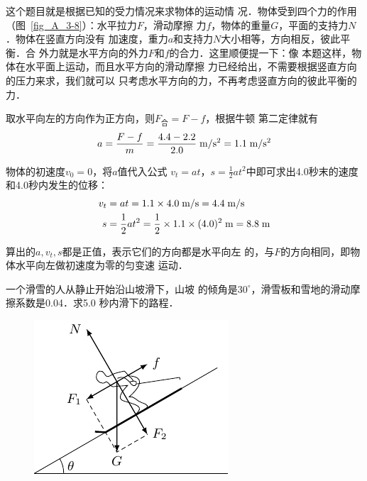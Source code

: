 \begin{solution}
这个题目就是根据已知的受力情况来求物体的运动情
况．物体受到四个力的作用（图~\ref{fig_A_3-8}）：水平拉力$F$，滑动摩擦
力$f$，物体的重量$G$，平面的支持力$N$．物体在竖直方向没有
加速度，重力$a$和支持力$N$大小相等，方向相反，彼此平衡．合
外力就是水平方向的外力$F$和$f$的合力．这里顺便提一下：像
本题这样，物体在水平面上运动，而且水平方向的滑动摩擦
力已经给出，不需要根据竖直方向的压力来求，我们就可以
只考虑水平方向的力，不再考虑竖直方向的彼此平衡的力．



    取水平向左的方向作为正方向，则$F_{\text{合}}=F-f$，根据牛顿
第二定律就有
\[a=\frac{F-f}{m}=\frac{4.4-2.2}{2.0}\;\text{m}/\text{s}^2=1.1\;\text{m}/\text{s}^2 \]
 
 物体的初速度$v_0=0$，将$a$值代入公式
$v_t=at $，$  s=\frac{1}{2}at^2$中即可求出4.0秒末的速度和4.0秒内发生的位移：
\[\begin{split}
v_t&=at=1.1\times 4.0\;\text{m}/\text{s} =4.4\;\text{m}/\text{s}\\
s&=\frac{1}{2}at^2=\frac{1}{2}\times 1.1\times (4.0)^2 \;\text{m}=8.8\;\text{m}
\end{split} \]
\end{solution}

    算出的$a,v_t,s$都是正值，表示它们的方向都是水平向左
的，与$F$的方向相同，即物体水平向左做初速度为零的匀变速
运动．

\begin{example}
一个滑雪的人从静止开始沿山坡滑下，山坡
的倾角是$30^\circ$，滑雪板和雪地的滑动摩擦系数是0.04．求5.0
秒内滑下的路程．
\end{example}

\begin{figure}[htp]
    \centering
    \includegraphics{fig/A/3-9.pdf}
    \caption{}\label{fig_A_3-9}
\end{figure}

